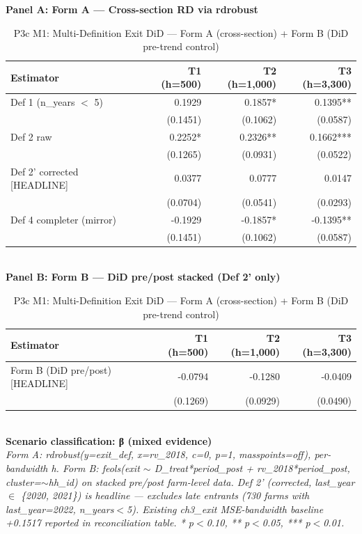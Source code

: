 \begin{table}[t]
\centering
\caption{P3c M1: Multi-Definition Exit DiD — Form A (cross-section) + Form B (DiD pre-trend control)}
\label{tab:ch5_exit_definitions_en}
\textbf{Panel A: Form A — Cross-section RD via rdrobust}\\
\begin{tabular}{lrrr}
\toprule
Estimator & T1 (h=500) & T2 (h=1,000) & T3 (h=3,300) \\
\midrule
Def 1 (n_years $<$ 5) & 0.1929 & 0.1857* & 0.1395** \\
       & (0.1451) & (0.1062) & (0.0587) \\
Def 2 raw & 0.2252* & 0.2326** & 0.1662*** \\
       & (0.1265) & (0.0931) & (0.0522) \\
Def 2' corrected [HEADLINE] & 0.0377 & 0.0777 & 0.0147 \\
       & (0.0704) & (0.0541) & (0.0293) \\
Def 4 completer (mirror) & -0.1929 & -0.1857* & -0.1395** \\
       & (0.1451) & (0.1062) & (0.0587) \\
\bottomrule
\end{tabular}\\[1ex]
\textbf{Panel B: Form B — DiD pre/post stacked (Def 2' only)}\\
\begin{tabular}{lrrr}
\toprule
Estimator & T1 (h=500) & T2 (h=1,000) & T3 (h=3,300) \\
\midrule
Form B (DiD pre/post) [HEADLINE] & -0.0794 & -0.1280 & -0.0409 \\
                                  & (0.1269) & (0.0929) & (0.0490) \\
\bottomrule
\end{tabular}\\[1ex]
\textbf{Scenario classification: β (mixed evidence)}\\
\footnotesize\textit{Form A: rdrobust(y=exit\_def, x=rv\_2018, c=0, p=1, masspoints=off), per-bandwidth h. Form B: feols(exit $\sim$ D\_treat*period\_post + rv\_2018*period\_post, cluster=$\sim$hh\_id) on stacked pre/post farm-level data. Def 2' (corrected, last\_year $\in$ \{2020, 2021\}) is headline — excludes late entrants (730 farms with last\_year=2022, n\_years$<$5). Existing ch3\_exit MSE-bandwidth baseline +0.1517 reported in reconciliation table. * p$<$0.10, ** p$<$0.05, *** p$<$0.01.}
\end{table}

